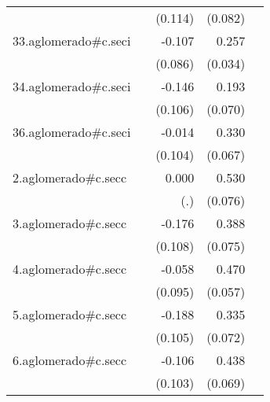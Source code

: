 {\begin{longtable}{l*{4}{D{.}{.}{-1}}}
            &                     &     (0.114)         &     (0.082)         &                     \\
\addlinespace
33.aglomerado#c.seci&                     &      -0.107         &       0.257\sym{***}&                     \\
            &                     &     (0.086)         &     (0.034)         &                     \\
\addlinespace
34.aglomerado#c.seci&                     &      -0.146         &       0.193\sym{**} &                     \\
            &                     &     (0.106)         &     (0.070)         &                     \\
\addlinespace
36.aglomerado#c.seci&                     &      -0.014         &       0.330\sym{***}&                     \\
            &                     &     (0.104)         &     (0.067)         &                     \\
\addlinespace
2.aglomerado#c.secc&                     &       0.000         &       0.530\sym{***}&                     \\
            &                     &         (.)         &     (0.076)         &                     \\
\addlinespace
3.aglomerado#c.secc&                     &      -0.176         &       0.388\sym{***}&                     \\
            &                     &     (0.108)         &     (0.075)         &                     \\
\addlinespace
4.aglomerado#c.secc&                     &      -0.058         &       0.470\sym{***}&                     \\
            &                     &     (0.095)         &     (0.057)         &                     \\
\addlinespace
5.aglomerado#c.secc&                     &      -0.188         &       0.335\sym{***}&                     \\
            &                     &     (0.105)         &     (0.072)         &                     \\
\addlinespace
6.aglomerado#c.secc&                     &      -0.106         &       0.438\sym{***}&                     \\
            &                     &     (0.103)         &     (0.069)         &                     \\

\end{longtable}}
